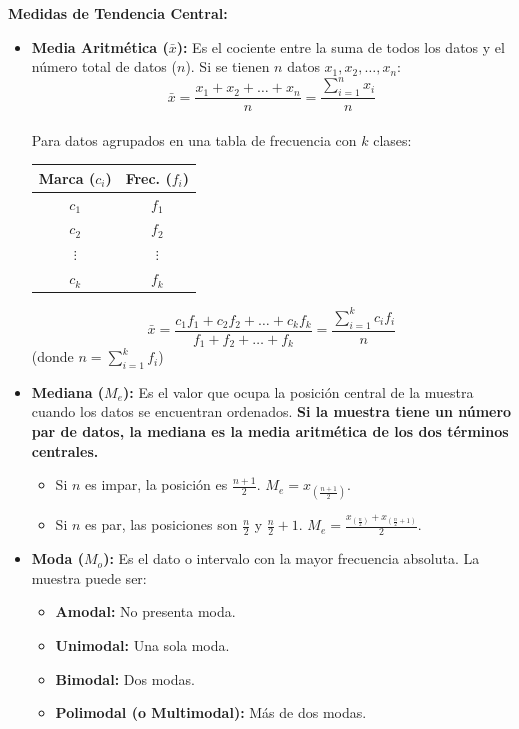 \documentclass[12pt, letterpaper]{article}
\begin{document}
\textbf{Medidas de Tendencia Central:}
\begin{itemize}
    \item \textbf{Media Aritmética ($\bar{x}$):} Es el cociente entre la suma de todos los datos y el número total de datos ($n$). Si se tienen $n$ datos $x_1, x_2, \dots, x_n$:
        \[ \bar{x}=\frac{x_1+x_2+\dots+x_n}{n} = \frac{\sum_{i=1}^{n} x_i}{n} \] \\
    Para datos agrupados en una tabla de frecuencia con $k$ clases:
    \begin{center}
        \begin{minipage}{0.35\textwidth}
            \centering
            \begin{tabular}{|c|c|} 
                \hline
                \textbf{Marca ($c_i$)} & \textbf{Frec. ($f_i$)} \\
                \hline
                $c_1$ & $f_1$ \\
                \hline
                $c_2$ & $f_2$ \\
                \hline
                $\vdots$ & $\vdots$ \\
                \hline
                $c_k$ & $f_k$ \\
                \hline
             \end{tabular}
        \end{minipage}
        \hfill
        \begin{minipage}{0.55\textwidth}
            \centering
            \[ \bar{x}=\frac{c_1 f_1 + c_2 f_2 + \dots + c_k f_k}{f_1+f_2+\dots+f_k} = \frac{\sum_{i=1}^{k} c_i f_i}{n} \]
            (donde $n = \sum_{i=1}^{k} f_i$)
        \end{minipage}
    \end{center}

    \item \textbf{Mediana ($M_e$):} Es el valor que ocupa la posición central de la muestra cuando los datos se encuentran ordenados. \textbf{Si la muestra tiene un número par de datos, la mediana es la media aritmética de los dos términos centrales.}
        \begin{itemize}
            \item Si $n$ es impar, la posición es $\frac{n+1}{2}$. $M_e = x_{(\frac{n+1}{2})}$.
            \item Si $n$ es par, las posiciones son $\frac{n}{2}$ y $\frac{n}{2}+1$. $M_e = \frac{x_{(\frac{n}{2})} + x_{(\frac{n}{2}+1)}}{2}$.
        \end{itemize}
    \item \textbf{Moda ($M_o$):} Es el dato o intervalo con la mayor frecuencia absoluta. La muestra puede ser:
        \begin{itemize}
            \item \textbf{Amodal:} No presenta moda.
            \item \textbf{Unimodal:} Una sola moda.
            \item \textbf{Bimodal:} Dos modas.
            \item \textbf{Polimodal (o Multimodal):} Más de dos modas.
        \end{itemize}
\end{itemize}
\end{document}
